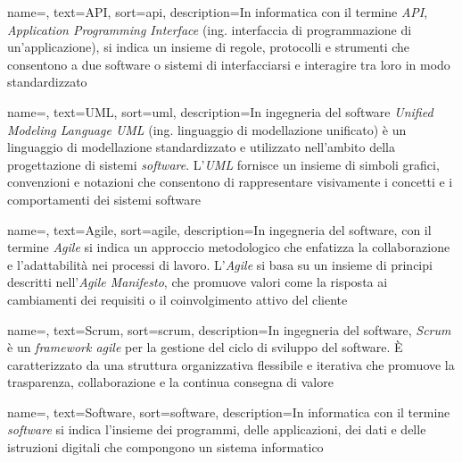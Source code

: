 

 {
    name=,
    text=API,
    sort=api,
    description={In informatica con il termine \emph{API}, \emph{Application Programming Interface} (ing. interfaccia di programmazione di un'applicazione), si indica
    un insieme di regole, protocolli e strumenti che consentono a due software o sistemi di interfacciarsi e interagire tra loro in modo standardizzato}
}

 {
    name=,
    text=UML,
    sort=uml,
    description={In ingegneria del software \emph{Unified Modeling Language UML} (ing. linguaggio di modellazione unificato) è un linguaggio di 
    modellazione standardizzato e utilizzato nell'ambito della progettazione di sistemi \emph{software}. L'\emph{UML} fornisce un insieme di simboli grafici, convenzioni e notazioni che consentono di rappresentare
    visivamente i concetti e i comportamenti dei sistemi software}
}

 {
    name=,
    text=Agile,
    sort=agile,
    description={In ingegneria del software, con il termine \emph{Agile} si indica un approccio metodologico che enfatizza la collaborazione e l'adattabilità nei processi di lavoro.
    L'\emph{Agile} si basa su un insieme di principi descritti nell'\emph{Agile Manifesto}, che promuove valori come la risposta ai cambiamenti dei requisiti o il coinvolgimento attivo del cliente}
}

 {
    name=,
    text=Scrum,
    sort=scrum,
    description={In ingegneria del software, \emph{Scrum} è un \emph{framework agile} per la gestione del ciclo di sviluppo del software.  È caratterizzato da una struttura organizzativa flessibile e iterativa che promuove la trasparenza, collaborazione e la continua consegna di valore}
}

 {
    name=,
    text=Software,
    sort=software,
    description={In informatica con il termine \emph{software} si indica l'insieme dei programmi, delle applicazioni, dei dati e delle istruzioni digitali che compongono un sistema informatico}
}

